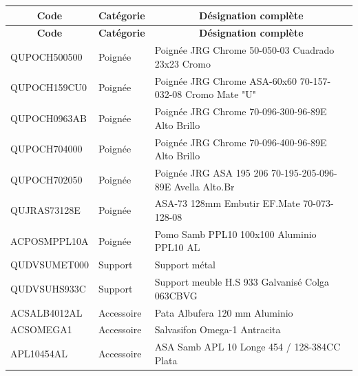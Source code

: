 \documentclass[12pt,a4paper]{article}
\begin{document}
\begin{longtable}{|p{3cm}|p{3cm}|p{8cm}|}
\hline
\multicolumn{1}{|c|}{\textbf{Code}} & \multicolumn{1}{c|}{\textbf{Catégorie}} & \multicolumn{1}{c|}{\textbf{Désignation complète}} \\
\hline
\endfirsthead
\hline
\multicolumn{1}{|c|}{\textbf{Code}} & \multicolumn{1}{c|}{\textbf{Catégorie}} & \multicolumn{1}{c|}{\textbf{Désignation complète}} \\
\hline
\endhead
\hline
\endfoot
QUPOCH500500 & Poignée & Poignée JRG Chrome 50-050-03 Cuadrado 23x23 Cromo \\
QUPOCH159CU0 & Poignée & Poignée JRG Chrome ASA-60x60 70-157-032-08 Cromo Mate "U" \\
QUPOCH0963AB & Poignée & Poignée JRG Chrome 70-096-300-96-89E Alto Brillo \\
QUPOCH704000 & Poignée & Poignée JRG Chrome 70-096-400-96-89E Alto Brillo \\
QUPOCH702050 & Poignée & Poignée JRG ASA 195 206 70-195-205-096-89E Avella Alto.Br \\
QUJRAS73128E & Poignée & ASA-73 128mm Embutir EF.Mate 70-073-128-08 \\
ACPOSMPPL10A & Poignée & Pomo Samb PPL10 100x100 Aluminio PPL10 AL \\
QUDVSUMET000 & Support & Support métal \\
QUDVSUHS933C & Support & Support meuble H.S 933 Galvanisé Colga 063CBVG \\
ACSALB4012AL & Accessoire & Pata Albufera 120 mm Aluminio \\
ACSOMEGA1 & Accessoire & Salvasifon Omega-1 Antracita \\
APL10454AL & Accessoire & ASA Samb APL 10 Longe 454 / 128-384CC Plata \\
\hline
\end{longtable}
\end{document}
